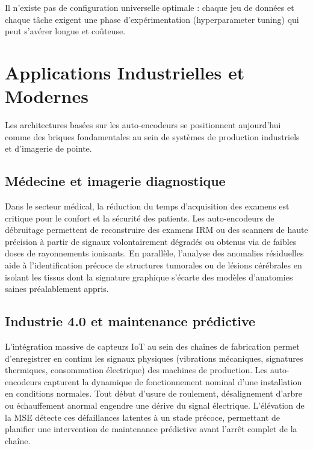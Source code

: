 \documentclass[11pt,a4paper]{report}
\begin{document}
Il n’existe pas de configuration universelle optimale : chaque jeu de données et chaque tâche exigent une phase d’expérimentation (hyperparameter tuning) qui peut s’avérer longue et coûteuse. 

\section{Applications Industrielles et Modernes}
\label{sec:applications_industrielles}

Les architectures basées sur les auto-encodeurs se positionnent aujourd'hui comme des briques fondamentales au sein de systèmes de production industriels et d'imagerie de pointe.

\subsection{Médecine et imagerie diagnostique}

Dans le secteur médical, la réduction du temps d'acquisition des examens est critique pour le confort et la sécurité des patients. Les auto-encodeurs de débruitage permettent de reconstruire des examens IRM ou des scanners de haute précision à partir de signaux volontairement dégradés ou obtenus via de faibles doses de rayonnements ionisants. En parallèle, l'analyse des anomalies résiduelles aide à l'identification précoce de structures tumorales ou de lésions cérébrales en isolant les tissus dont la signature graphique s'écarte des modèles d'anatomies saines préalablement appris.

\subsection{Industrie 4.0 et maintenance prédictive}

L'intégration massive de capteurs IoT au sein des chaînes de fabrication permet d'enregistrer en continu les signaux physiques (vibrations mécaniques, signatures thermiques, consommation électrique) des machines de production. Les auto-encodeurs capturent la dynamique de fonctionnement nominal d'une installation en conditions normales. Tout début d'usure de roulement, désalignement d'arbre ou échauffement anormal engendre une dérive du signal électrique. L'élévation de la MSE détecte ces défaillances latentes à un stade précoce, permettant de planifier une intervention de maintenance prédictive avant l'arrêt complet de la chaîne.
\end{document}
